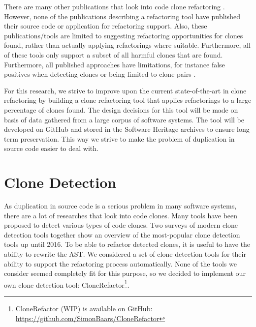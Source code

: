 \documentclass[a4paper]{article}
\begin{document}
There are many other publications that look into code clone refactoring \cite{alwaqfi2017refactoring, chen2018clone, koni2001scenario}. However, none of the publications describing a refactoring tool have published their source code or application for refactoring support. Also, these publications/tools are limited to suggesting refactoring opportunities for clones found, rather than actually applying refactorings where suitable. Furthermore, all of these tools only support a subset of all harmful clones that are found. Furthermore, all published approaches have limitations, for instance false positives when detecting clones \cite{chen2018clone} or being limited to clone pairs \cite{higo2008metric}.

For this research, we strive to improve upon the current state-of-the-art in clone refactoring by building a clone refactoring tool that applies refactorings to a large percentage of clones found. The design decisions for this tool will be made on basis of data gathered from a large corpus of software systems. The tool will be developed on GitHub and stored in the Software Heritage \cite{di2017software} archives to ensure long term preservation. This way we strive to make the problem of duplication in source code easier to deal with.

\section{Clone Detection}
As duplication in source code is a serious problem in many software systems, there are a lot of researches that look into code clones. Many tools have been proposed to detect various types of code clones. Two surveys of modern clone detection tools \cite{sheneamer2016survey, svajlenko2014evaluating} together show an overview of the most-popular clone detection tools up until 2016. To be able to refactor detected clones, it is useful to have the ability to rewrite the AST. We considered a set of clone detection tools for their ability to support the refactoring process automatically. None of the tools we consider seemed completely fit for this purpose, so we decided to implement our own clone detection tool: CloneRefactor\footnote{CloneRefactor (WIP) is available on GitHub: \url{https://github.com/SimonBaars/CloneRefactor}}.
\end{document}
